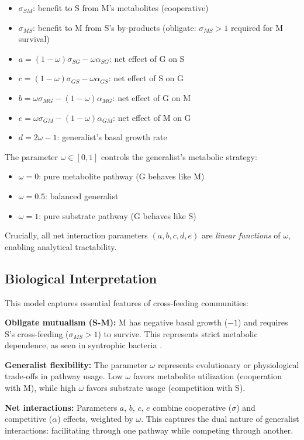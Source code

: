 \documentclass[11pt]{article}
\begin{document}
\begin{itemize}
\item $\sigma_{SM}$: benefit to S from M's metabolites (cooperative)
\item $\sigma_{MS}$: benefit to M from S's by-products (obligate: $\sigma_{MS} > 1$ required for M survival)
\item $a = (1-\omega)\sigma_{SG} - \omega\alpha_{SG}$: net effect of G on S
\item $c = (1-\omega)\sigma_{GS} - \omega\alpha_{GS}$: net effect of S on G
\item $b = \omega\sigma_{MG} - (1-\omega)\alpha_{MG}$: net effect of G on M
\item $e = \omega\sigma_{GM} - (1-\omega)\alpha_{GM}$: net effect of M on G
\item $d = 2\omega - 1$: generalist's basal growth rate
\end{itemize}

The parameter $\omega \in [0,1]$ controls the generalist's metabolic strategy:
\begin{itemize}
\item $\omega = 0$: pure metabolite pathway (G behaves like M)
\item $\omega = 0.5$: balanced generalist
\item $\omega = 1$: pure substrate pathway (G behaves like S)
\end{itemize}

Crucially, all net interaction parameters $(a, b, c, d, e)$ are \textit{linear functions} of $\omega$, enabling analytical tractability.

\subsection{Biological Interpretation}

This model captures essential features of cross-feeding communities:

\textbf{Obligate mutualism (S-M):} M has negative basal growth ($-1$) and requires S's cross-feeding ($\sigma_{MS} > 1$) to survive. This represents strict metabolic dependence, as seen in syntrophic bacteria \cite{schink2002syntrophic}.

\textbf{Generalist flexibility:} The parameter $\omega$ represents evolutionary or physiological trade-offs in pathway usage. Low $\omega$ favors metabolite utilization (cooperation with M), while high $\omega$ favors substrate usage (competition with S).

\textbf{Net interactions:} Parameters $a$, $b$, $c$, $e$ combine cooperative ($\sigma$) and competitive ($\alpha$) effects, weighted by $\omega$. This captures the dual nature of generalist interactions: facilitating through one pathway while competing through another.
\end{document}

